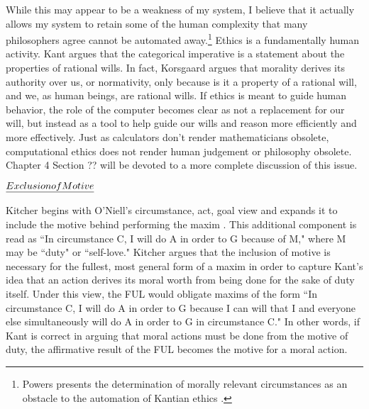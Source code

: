 \begin{isabellebody}
\begin{isamarkuptext}
While this may appear to be a weakness of my system, I believe that it actually
allows my system to retain some of the human complexity that many philosophers agree cannot be automated away.\footnote{Powers presents 
the determination of morally relevant circumstances as an obstacle to the automation of Kantian ethics \cite{powers}.}
Ethics is a fundamentally human activity. Kant argues that the categorical imperative is a statement 
about the properties of rational wills. In fact, Korsgaard argues that morality derives its authority over us, 
or normativity, only because is it a property of a rational will, and we, as human beings, are rational wills.
If ethics is meant to guide human behavior, the role of the computer becomes clear as not a replacement for our will,
but instead as a tool to help guide our wills and reason more efficiently 
and more effectively. Just as calculators don't render mathematicians obsolete, computational ethics
does not render human judgement or philosophy obsolete. Chapter 4 Section ?? will be devoted to a more complete discussion 
of this issue.

$\emph{Exclusion of Motive}$

Kitcher begins with O'Niell's circumstance, act, goal view and expands it to include the motive 
behind performing the maxim \cite{whatisamaxim}. This additional component is read 
as ``In circumstance C, I will do A in order to G because of M," where M may be ``duty" or ``self-love."
Kitcher argues that the inclusion of motive is necessary for the fullest, most general form of a maxim
in order to capture Kant's idea that an action derives its moral worth from being done for the sake of duty itself.
Under this view, the FUL would obligate maxims of the form 
``In circumstance C, I will do A in order to G because I can will that I and everyone else simultaneously
will do A in order to G in circumstance C." In other words, if Kant is correct in arguing that moral 
actions must be done from the motive of duty, the affirmative result of the FUL becomes 
the motive for a moral action.


\end{isamarkuptext}
\end{isabellebody}

